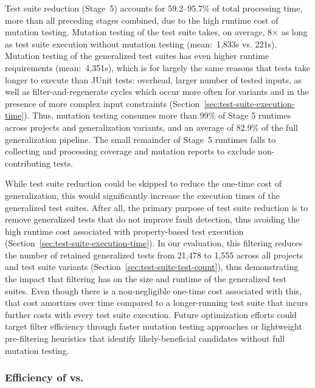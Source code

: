 Test suite reduction (Stage~5) accounts for 59.2--95.7\% of total processing time,
more than all preceding stages combined,
due to the high runtime cost of mutation testing.
Mutation testing of the \VariantOriginal{} test suite takes,
on average, 8$\times$ as long
as \VariantOriginal{} test suite execution without mutation testing (mean:~1,833s vs. 221s).
Mutation testing of the generalized test suites has even higher
runtime requirements (mean:~4,351s),
which is for largely the same reasons
that \ToolJqwik{} tests
take longer to execute than JUnit tests:
\ToolJqwik{} overhead, larger number of tested inputs,
as well as filter-and-regenerate cycles
which occur more often for \VariantNaive{} variants
and in the presence of more complex input constraints (Section~\ref{sec:test-suite-execution-time}).
Thus, mutation testing consumes more than 99\%
of Stage 5 runtimes across projects and generalization variants,
and an average of 82.9\% of the full generalization pipeline.
The small remainder of Stage~5 runtimes falls to
collecting and processing
coverage and mutation reports to exclude non-contributing tests.

While test suite reduction could be skipped to reduce the one-time cost of generalization,
this would significantly increase the execution times of the generalized test suites.
After all, the primary purpose of test suite reduction
is to remove generalized tests that do not improve fault detection,
thus avoiding the high runtime cost
associated with property-based test execution (Section~\ref{sec:test-suite-execution-time}).
In our evaluation, this filtering reduces the number of retained generalized tests
from 21,478 to 1,555 across all projects and test suite variants
(Section~\ref{sec:test-suite-test-count}),
thus demonstrating the impact
that filtering has on the size and runtime of the generalized test suites.
Even though there is a non-negligible one-time cost associated with this,
that cost amortizes over time compared to a longer-running test suite
that incurs further costs with every test suite execution.
Future optimization efforts could target filter efficiency
through faster mutation testing approaches
or lightweight pre-filtering heuristics
that identify likely-beneficial candidates
without full mutation testing.

\subsubsection{Efficiency of \ToolTeralizer{} vs.\ \ToolEvoSuite{}}
\label{sec:execution-efficiency}

